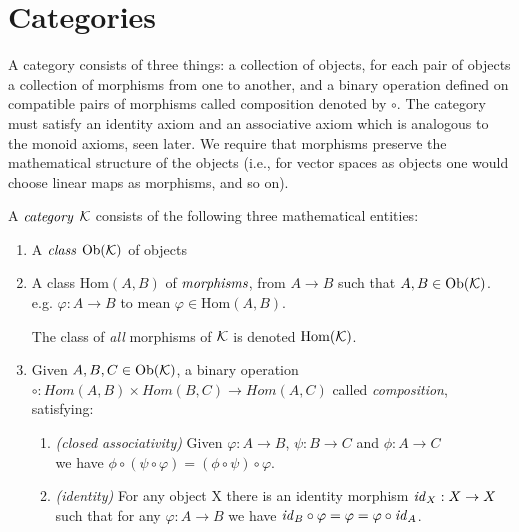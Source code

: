 \section{Categories} %
\label{sec:categories}
A category consists of three things:
a collection of objects, for each pair of objects a collection of morphisms from one to another, and a binary
operation defined on compatible pairs of morphisms called composition denoted by $\circ$. The category must satisfy an identity axiom
and an associative axiom which is analogous to the monoid axioms, seen later. We require that morphisms preserve the
mathematical structure of the objects (i.e., for vector spaces as objects one would choose linear maps as morphisms, and so on).
\begin{defn}[Category]
	A $\emph{category}$ $\mathcal{K}$ consists of the following three mathematical entities:
	\begin{enumerate}
		\item A $\emph{class}$ $\text{Ob}(\mathcal{K})$ of objects
		
		\item A class $\text{Hom}(A,B)$ of $\emph{morphisms}$, from $A \longrightarrow B$ such that $A, B \in \text{Ob}(\mathcal{K})$.
		\\
		e.g. $\varphi : A \to B$ to mean $\varphi \in \text{Hom}(A,B)$.
		\begin{rem}
		The class of \emph{all} morphisms of $\mathcal{K}$ is denoted $\text{Hom}(\mathcal{K})$.
		\end{rem}

		\item Given $A, B, C \in \text{Ob}(\mathcal{K})$, a binary operation $\circ : Hom(A,B) \times Hom(B,C) \to Hom(A,C)$ called
		\emph{composition}, satisfying:
		\begin{enumerate}
			\item \emph{(closed associativity)} Given $\varphi : A \to B$, $\psi: B \to C$ and $\phi: A \to C$
			\\
			we have $\phi \circ (\psi \circ \varphi) = (\phi \circ \psi) \circ \varphi$.
			\\
			
			\item \emph{(identity)} For any object X there is an identity morphism $\mathit{id}_{X} : X \to X$ such that for any $\varphi: A \to B$ we have $\mathit{id}_{B} \circ \varphi = \varphi = \varphi \circ \mathit{id}_{A}$.
			\\
		\end{enumerate}
	\end{enumerate}
\end{defn}

